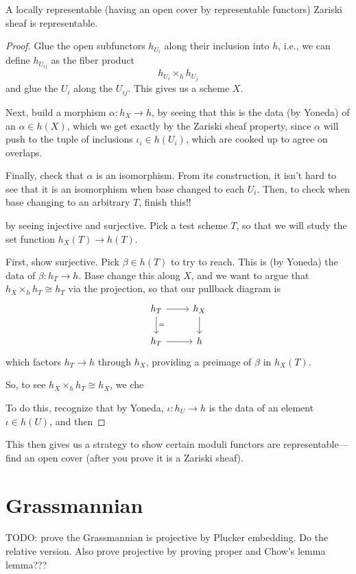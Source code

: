 \documentclass[12pt]{article}
\begin{document}
\begin{prop}
    A locally representable (having an open cover by representable functors) Zariski sheaf is representable.
\end{prop}
\begin{proof}
    Glue the open subfunctors $h_{U_i}$ along their inclusion into $h$, i.e., we can define $h_{U_{ij}}$ as the fiber product
    \[h_{U_i} \times_h h_{U_j}\]
    and glue the $U_i$ along the $U_{ij}$. This gives us a scheme $X$.

    Next, build a morphism $\alpha: h_X\to h$, by seeing that this is the data (by Yoneda) of an $\alpha \in h(X)$, which we get exactly by the Zariski sheaf property, since $\alpha$ will push to the tuple of inclusions $\iota_i \in h(U_i)$, which are cooked up to agree on overlaps.

    Finally, check that $\alpha$ is an isomorphism. From its construction, it isn't hard to see that it is an isomorphism when base changed to each $U_i$. Then, to check when base changing to an arbitrary $T$, {\color{red} finish this!!}
    
    by seeing injective and surjective. Pick a test scheme $T$, so that we will study the set function $h_X(T) \to h(T)$.

    First, show surjective. Pick $\beta \in h(T)$ to try to reach. This is (by Yoneda) the data of $\beta: h_T \to h$. Base change this along $X$, and we want to argue that $h_X \times_h h_T \cong h_T$ via the projection, so that our pullback diagram is
    \[\begin{tikzcd}
    h_T \dar["="] \rar & h_X \dar\\
    h_T \rar & h
    \end{tikzcd}\]
    which factors $h_T\to h$ through $h_X$, providing a preimage of $\beta$ in $h_X(T)$.

    So, to see $h_X\times_h h_T \cong h_X$, we che
    
    To do this, recognize that by Yoneda, $\iota: h_U \to h$ is the data of an element $\iota \in h(U)$, and then 
\end{proof}

This then gives us a strategy to show certain moduli functors are representable---find an open cover (after you prove it is a Zariski sheaf).


\section{Grassmannian}

TODO: prove the Grassmannian is projective by Plucker embedding. Do the relative version. Also prove projective by proving proper and Chow's lemma lemma???


\end{document}
